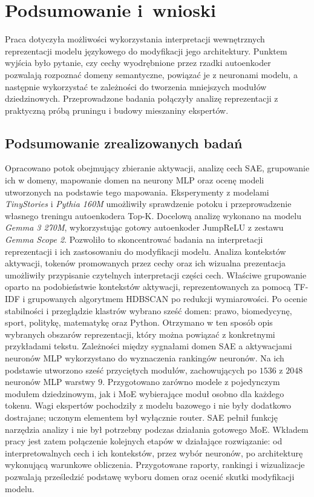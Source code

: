 \chapter{Podsumowanie i~wnioski}
\label{chap:zakonczenie}

Praca dotyczyła możliwości wykorzystania interpretacji wewnętrznych reprezentacji modelu językowego do modyfikacji jego architektury. Punktem wyjścia było pytanie, czy cechy wyodrębnione przez rzadki autoenkoder pozwalają rozpoznać domeny semantyczne, powiązać je z neuronami modelu, a następnie wykorzystać te zależności do tworzenia mniejszych modułów dziedzinowych. Przeprowadzone badania połączyły analizę reprezentacji z praktyczną próbą pruningu i budowy mieszaniny ekspertów.

\section{Podsumowanie zrealizowanych badań}
\label{sec:podsumowanie_badan}

Opracowano potok obejmujący zbieranie aktywacji, analizę cech SAE, grupowanie ich w domeny, mapowanie domen na neurony MLP oraz ocenę modeli utworzonych na podstawie tego mapowania. Eksperymenty z modelami \textit{TinyStories} i \textit{Pythia 160M} umożliwiły sprawdzenie potoku i przeprowadzenie własnego treningu autoenkodera Top-K. Docelową analizę wykonano na modelu \textit{Gemma 3 270M}, wykorzystując gotowy autoenkoder JumpReLU z zestawu \textit{Gemma Scope 2}. Pozwoliło to skoncentrować badania na interpretacji reprezentacji i ich zastosowaniu do modyfikacji modelu. \newline
Analiza kontekstów aktywacji, tokenów promowanych przez cechy oraz ich wizualna prezentacja umożliwiły przypisanie czytelnych interpretacji części cech. Właściwe grupowanie oparto na podobieństwie kontekstów aktywacji, reprezentowanych za pomocą TF-IDF i grupowanych algorytmem HDBSCAN po redukcji wymiarowości. Po ocenie stabilności i przeglądzie klastrów wybrano sześć domen: prawo, biomedycynę, sport, politykę, matematykę oraz Python. Otrzymano w ten sposób opis wybranych obszarów reprezentacji, który można powiązać z konkretnymi przykładami tekstu. \newline
Zależności między sygnałami domen SAE a aktywacjami neuronów MLP wykorzystano do wyznaczenia rankingów neuronów. Na ich podstawie utworzono sześć przyciętych modułów, zachowujących po $1536$ z $2048$ neuronów MLP warstwy $9$. Przygotowano zarówno modele z pojedynczym modułem dziedzinowym, jak i MoE wybierające moduł osobno dla każdego tokenu. Wagi ekspertów pochodziły z modelu bazowego i nie były dodatkowo dostrajane; uczonym elementem był wyłącznie router. SAE pełnił funkcję narzędzia analizy i nie był potrzebny podczas działania gotowego MoE. \newline
Wkładem pracy jest zatem połączenie kolejnych etapów w działające rozwiązanie: od interpretowalnych cech i ich kontekstów, przez wybór neuronów, po architekturę wykonującą warunkowe obliczenia. Przygotowane raporty, rankingi i wizualizacje pozwalają prześledzić podstawę wyboru domen oraz ocenić skutki modyfikacji modelu.

